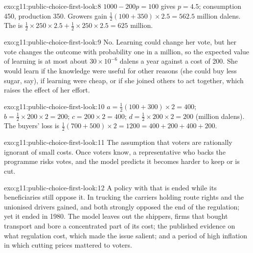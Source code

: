 \begin{solution}{exo:g11:public-choice-first-look:8}
$1000 - 200p = 100$ gives $p = 4.5$; consumption 450, production 350. Growers gain $\tfrac12(100 + 350) \times 2.5 = 562.5$ million dalens. The  is
$\tfrac12 \times 250 \times 2.5 + \tfrac12 \times 250 \times 2.5 = 625$ million.
\end{solution}

\begin{solution}{exo:g11:public-choice-first-look:9}
No. Learning could change her vote, but her vote changes the outcome with probability one in a million, so the expected value of learning is at most about $30 \times
10^{-6}$ dalens a year against a cost of 200. She would learn if the knowledge were useful for other reasons (she could buy less sugar, say), if learning were cheap, or if
she joined others to act together, which raises the effect of her effort.
\end{solution}

\begin{solution}{exo:g11:public-choice-first-look:10}
$a = \tfrac12(100 + 300) \times 2 = 400$; $b = \tfrac12 \times 200 \times 2 = 200$; $c = 200 \times 2 = 400$; $d = \tfrac12 \times 200 \times 2 = 200$ (million dalens).
The buyers' loss is $\tfrac12(700 + 500) \times 2 = 1200 = 400 + 200 + 400 + 200$.
\end{solution}

\begin{solution}{exo:g11:public-choice-first-look:11}
The assumption that voters are rationally ignorant of small costs. Once voters know, a representative who backs the programme risks votes, and the model predicts it
becomes harder to keep or is cut.
\end{solution}

\begin{solution}{exo:g11:public-choice-first-look:12}
A policy with  that is ended while its beneficiaries still oppose it. In trucking the carriers holding route rights and the
unionised drivers gained, and both strongly opposed the end of the regulation; yet it ended in 1980. The model leaves out the shippers, firms that bought transport and bore
a concentrated part of its cost; the published evidence on what regulation cost, which made the issue salient; and a period of high inflation in which cutting prices
mattered to voters.
\end{solution}

